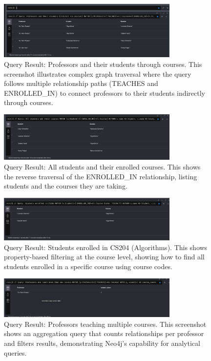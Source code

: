\begin{figure}[H]
  \centering
  \includegraphics[width=0.8\textwidth]{task-3/screenshots/prof-and-their-students.png}
  \caption{Query Result: Professors and their students through courses. This screenshot illustrates complex graph traversal where the query follows multiple relationship paths (TEACHES and ENROLLED\_IN) to connect professors to their students indirectly through courses.}
  \label{fig:task3-prof-students}
\end{figure}

\begin{figure}[H]
  \centering
  \includegraphics[width=0.8\textwidth]{task-3/screenshots/student-and-their-courses.png}
  \caption{Query Result: All students and their enrolled courses. This shows the reverse traversal of the ENROLLED\_IN relationship, listing students and the courses they are taking.}
  \label{fig:task3-student-courses}
\end{figure}

\begin{figure}[H]
  \centering
  \includegraphics[width=0.8\textwidth]{task-3/screenshots/students-in-cs204.png}
  \caption{Query Result: Students enrolled in CS204 (Algorithms). This shows property-based filtering at the course level, showing how to find all students enrolled in a specific course using course codes.}
  \label{fig:task3-students-cs204}
\end{figure}

\begin{figure}[H]
  \centering
  \includegraphics[width=0.8\textwidth]{task-3/screenshots/who-teaches-more-than-one-course.png}
  \caption{Query Result: Professors teaching multiple courses. This screenshot shows an aggregation query that counts relationships per professor and filters results, demonstrating Neo4j's capability for analytical queries.}
  \label{fig:task3-multi-course-prof}
\end{figure}

